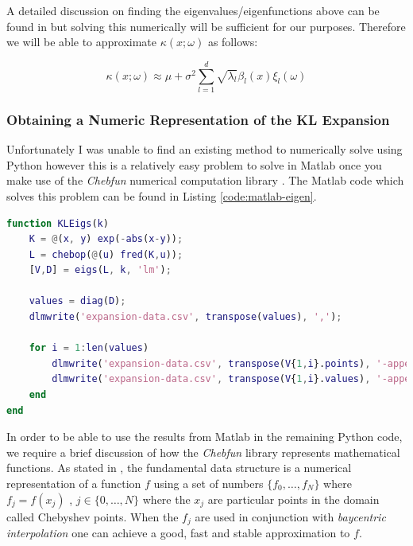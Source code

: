A detailed discussion on finding the eigenvalues/eigenfunctions above can be
found in \cite{stochastic-fem} but solving this numerically will be sufficient
for our purposes. Therefore we will be able to approximate $\kappa(x;\omega)$
as follows:

\begin{equation}\label{eq:oned-stochastic-kl-kappa}
    \kappa(x;\omega) \approx
        \mu + \sigma^2\sum_{l=1}^d\sqrt{\lambda_l}\beta_l(x)\xi_l(\omega)
\end{equation}

\subsubsection{Obtaining a Numeric Representation of the KL Expansion}

Unfortunately I was unable to find an existing method to numerically solve
 using Python however this is
a relatively easy problem to solve in Matlab once you make use of the
\textit{Chebfun} numerical computation library \cite{chebfun}. The Matlab code
which solves this problem can be found in Listing \ref{code:matlab-eigen}.

\begin{lstlisting}[caption={Matlab code which finds the first 5 eigenvalues and
                            associated eigenfunctions},
                   label={code:matlab-eigen},
                   language=Matlab]
function KLEigs(k)
    K = @(x, y) exp(-abs(x-y));
    L = chebop(@(u) fred(K,u));
    [V,D] = eigs(L, k, 'lm');

    values = diag(D);
    dlmwrite('expansion-data.csv', transpose(values), ',');

    for i = 1:len(values)
        dlmwrite('expansion-data.csv', transpose(V{1,i}.points), '-append', 'delimiter', ',');
        dlmwrite('expansion-data.csv', transpose(V{1,i}.values), '-append', 'delimiter', ',');
    end
end
\end{lstlisting}

In order to be able to use the results from Matlab in the remaining Python
code, we require a brief discussion of how the \textit{Chebfun} library
represents mathematical functions. As stated in \cite{chebfun-data}, the
fundamental data structure  is a numerical representation of a
function $f$ using a set of numbers $\{f_0, \ldots, f_N\}$ where $f_j = f(x_j)$
, $j \in \{0, \ldots, N\}$ where the $x_j$ are particular points in the domain
called Chebyshev points. When the $f_j$ are used in conjunction with
\textit{baycentric interpolation} one can achieve a good, fast and stable
approximation to $f$.

